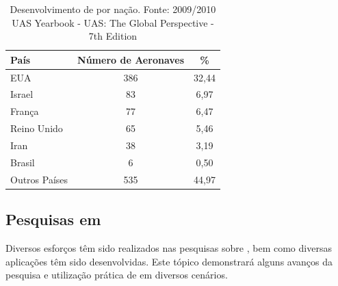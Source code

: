 \begin{table}[h!]
\centering
	\begin{tabular}{| l | c | c |}
		\hline
		País & Número de Aeronaves & \% \\
		\hline
		EUA & 386 & 32,44 \\
		Israel & 83 & 6,97 \\
		França & 77 & 6,47 \\
		Reino Unido & 65 & 5,46 \\
		Iran & 38 & 3,19 \\
		Brasil & 6 & 0,50\\
		Outros Países & 535 & 44,97 \\
		\hline
	\end{tabular}

	\caption{Desenvolvimento de \vants por nação. Fonte: 2009/2010 UAS Yearbook - UAS: The Global Perspective - 7th Edition}
	\label{tbl:country}
\end{table}


\subsection{Pesquisas em \vants}
Diversos esforços têm sido realizados nas pesquisas sobre \uavs, bem como diversas aplicações têm sido desenvolvidas. Este tópico demonstrará alguns avanços da pesquisa e
utilização prática de \vants em diversos cenários.

